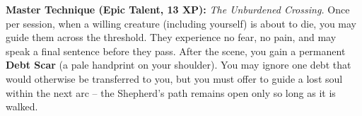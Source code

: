 \begin{tcolorbox}[colback=black!5,colframe=gray!70!black,title=\textbf{Crossing Monk (Pale Shepherd)},breakable]
  \vspace{2mm}
  \noindent\textbf{Master Technique (Epic Talent, 13 XP):}
  \textit{The Unburdened Crossing.} Once per session, when a willing creature (including yourself) is about to die, you may guide them across the threshold. They experience no fear, no pain, and may speak a final sentence before they pass. After the scene, you gain a permanent \textbf{Debt Scar} (a pale handprint on your shoulder). You may ignore one debt that would otherwise be transferred to you, but you must offer to guide a lost soul within the next arc -- the Shepherd's path remains open only so long as it is walked.
\end{tcolorbox}
